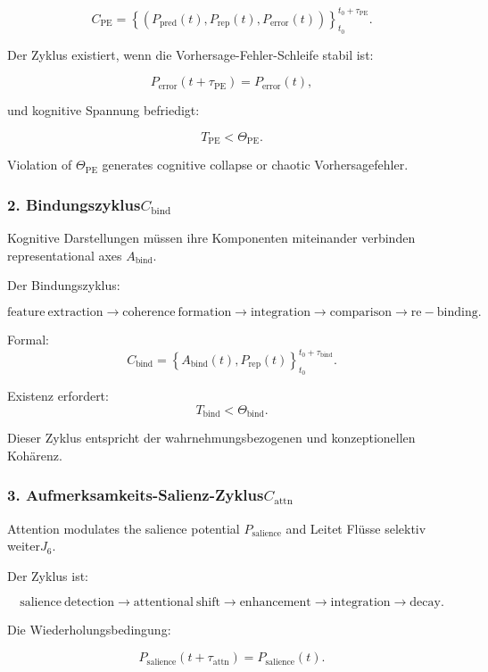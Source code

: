 \[
 C_{\mathrm{PE}} = 
 \left\{
   (P_{\mathrm{pred}}(t),
    P_{\mathrm{rep}}(t),
    P_{\mathrm{error}}(t))
 \right\}_{t_0}^{t_0+\tau_{\mathrm{PE}}}.
\]

Der Zyklus existiert, wenn die Vorhersage-Fehler-Schleife stabil ist:

\[
 P_{\mathrm{error}}(t+\tau_{\mathrm{PE}}) = P_{\mathrm{error}}(t),
\]

und kognitive Spannung befriedigt:

\[
 T_{\mathrm{PE}} < \Theta_{\mathrm{PE}}.
\]

Violation of $\Theta_{\mathrm{PE}}$ generates cognitive collapse or chaotic
Vorhersagefehler.

\subsubsection{2. Bindungszyklus$C_{\mathrm{bind}}$}

Kognitive Darstellungen müssen ihre Komponenten miteinander verbinden
representational axes $A_{\mathrm{bind}}$.

Der Bindungszyklus:

\[
 \mathrm{feature\ extraction}
 \to
 \mathrm{coherence\ formation}
 \to
 \mathrm{integration}
 \to
 \mathrm{comparison}
 \to
 \mathrm{re-binding}.
\]

Formal:
\[
 C_{\mathrm{bind}} =
 \left\{
   A_{\mathrm{bind}}(t), P_{\mathrm{rep}}(t)
 \right\}_{t_0}^{t_0+\tau_{\mathrm{bind}}}.
\]

Existenz erfordert:
\[
 T_{\mathrm{bind}} < \Theta_{\mathrm{bind}}.
\]

Dieser Zyklus entspricht der wahrnehmungsbezogenen und konzeptionellen Kohärenz.

\subsubsection{3. Aufmerksamkeits-Salienz-Zyklus$C_{\mathrm{attn}}$}

Attention modulates the salience potential $P_{\mathrm{salience}}$ and
Leitet Flüsse selektiv weiter$J_6$.

Der Zyklus ist:

\[
  \mathrm{salience\ detection}
  \to
  \mathrm{attentional\ shift}
  \to
  \mathrm{enhancement}
  \to
  \mathrm{integration}
  \to
  \mathrm{decay}.
\]

Die Wiederholungsbedingung:

\[
  P_{\mathrm{salience}}(t+\tau_{\mathrm{attn}}) = P_{\mathrm{salience}}(t).
\]

